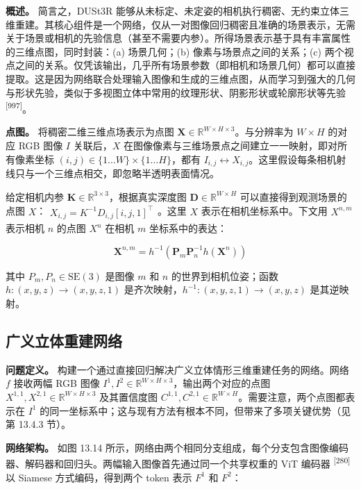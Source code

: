 \textbf{概述。} 简言之，DUSt3R 能够从未标定、未定姿的相机执行稠密、无约束立体三维重建。其核心组件是一个网络，仅从一对图像回归稠密且准确的场景表示，无需关于场景或相机的先验信息（甚至不需要内参）。所得场景表示基于具有丰富属性的三维点图，同时封装：(a) 场景几何；(b) 像素与场景点之间的关系；(c) 两个视点之间的关系。仅凭该输出，几乎所有场景参数（即相机和场景几何）都可以直接提取。这是因为网络联合处理输入图像和生成的三维点图，从而学习到强大的几何与形状先验，类似于多视图立体中常用的纹理形状、阴影形状或轮廓形状等先验 \textsuperscript{[997]}。

\textbf{点图。} 将稠密二维三维点场表示为点图 $\pmb X\in\mathbb{R}^{W\times H\times3}$。与分辨率为 $W\times H$ 的对应 RGB 图像 $I$ 关联后，$X$ 在图像像素与三维场景点之间建立一一映射，即对所有像素坐标 $(i,j)\in\{1\ldots W\}\times\{1\ldots H\}$，都有 $I_{i,j}\leftrightarrow X_{i,j}$。这里假设每条相机射线只与一个三维点相交，即忽略半透明表面情况。

给定相机内参 $\pmb K\in\mathbb{R}^{3\times3}$，根据真实深度图 $\pmb D\in\mathbb{R}^{W\times H}$ 可以直接得到观测场景的点图 $X$：$\begin{array}{r}{X_{i,j}=K^{-1}D_{i,j}[i,j,1]^{\intercal}}\end{array}$。这里 $X$ 表示在相机坐标系中。下文用 $X^{n,m}$ 表示相机 $n$ 的点图 $X^n$ 在相机 $m$ 坐标系中的表达：

\begin{equation}
\boldsymbol {X} ^ {n, m} = h ^ {- 1} \left(\boldsymbol {P} _ {m} \boldsymbol {P} _ {n} ^ {- 1} h \left(\boldsymbol {X} ^ {n}\right)\right)\tag{13.14}
\end{equation}

其中 $P_m,P_n\in\mathrm{SE}(3)$ 是图像 $m$ 和 $n$ 的世界到相机位姿；函数 $h:(x,y,z)\to(x,y,z,1)$ 是齐次映射，$h^{-1}:(x,y,z,1)\to(x,y,z)$ 是其逆映射。

\subsection{广义立体重建网络}

\textbf{问题定义。} 构建一个通过直接回归解决广义立体情形三维重建任务的网络。网络 $f$ 接收两幅 RGB 图像 $I^1,I^2\in\mathbb{R}^{W\times H\times3}$，输出两个对应的点图 $X^{1,1},X^{2,1}\in\mathbb{R}^{W\times H\times3}$ 及其置信度图 $C^{1,1},C^{2,1}\in\mathbb{R}^{W\times H}$。需要注意，两个点图都表示在 $I^1$ 的同一坐标系中；这与现有方法有根本不同，但带来了多项关键优势（见第 13.4.3 节）。

\textbf{网络架构。} 如图 13.14 所示，网络由两个相同分支组成，每个分支包含图像编码器、解码器和回归头。两幅输入图像首先通过同一个共享权重的 ViT 编码器 \textsuperscript{[280]} 以 Siamese 方式编码，得到两个 token 表示 $F^1$ 和 $F^2$：

